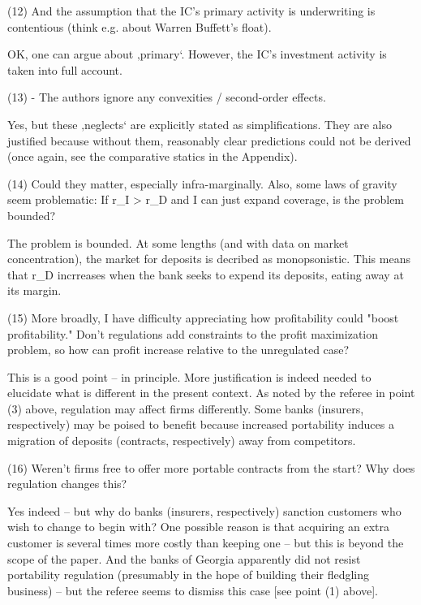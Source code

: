 (12) And the assumption that the IC's primary activity is underwriting is contentious (think e.g. about Warren Buffett's float).

OK, one can argue about ‚primary‘. However, the IC’s investment activity is taken into full account.


(13) - The authors ignore any convexities / second-order effects. 

Yes, but these ‚neglects‘ are explicitly stated as simplifications. They are also justified because without them, reasonably clear predictions could not be derived (once again, see the comparative statics in the Appendix).
 
(14) Could they matter, especially infra-marginally. Also, some laws of gravity seem problematic: If r_I > r_D and I can just expand coverage, is the problem bounded?

The problem is bounded. At some lengths (and with data on market concentration), the market for deposits is decribed as monopsonistic. This means that r_D incrreases when the bank seeks to expend its deposits, eating away at its margin. 

(15) More broadly, I have difficulty appreciating how profitability could "boost profitability." Don't regulations add constraints to the profit maximization problem, so how can profit increase relative to the unregulated case? 

This is a good point – in principle. More justification is indeed needed to elucidate what is different in the present context. As noted by the referee in point (3) above, regulation may affect firms differently. Some banks (insurers, respectively) may be poised to benefit because increased portability induces a migration of deposits (contracts, respectively) away from competitors. 
 
(16) Weren't firms free to offer more portable contracts from the start? Why does regulation changes this? 

Yes indeed – but why do banks (insurers, respectively) sanction customers who wish to change to begin with? One possible reason is that acquiring an extra customer is several times more costly than keeping one – but this is beyond the scope of the paper. And the banks of Georgia apparently did not resist portability regulation (presumably in the hope of building their fledgling business) – but the referee seems to dismiss this case [see point (1) above].  
